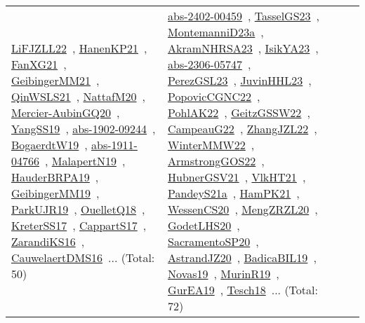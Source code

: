 {\begin{longtable}{lp{3cm}>{\raggedright\arraybackslash}p{6cm}>{\raggedright\arraybackslash}p{6cm}>{\raggedright\arraybackslash}p{8cm}}
\href{papers/LiFJZLL22.pdf}{LiFJZLL22}~\cite{LiFJZLL22}, \href{papers/HanenKP21.pdf}{HanenKP21}~\cite{HanenKP21}, \href{articles/FanXG21.pdf}{FanXG21}~\cite{FanXG21}, \href{papers/GeibingerMM21.pdf}{GeibingerMM21}~\cite{GeibingerMM21}, \href{articles/QinWSLS21.pdf}{QinWSLS21}~\cite{QinWSLS21}, \href{papers/NattafM20.pdf}{NattafM20}~\cite{NattafM20}, \href{papers/Mercier-AubinGQ20.pdf}{Mercier-AubinGQ20}~\cite{Mercier-AubinGQ20}, \href{papers/YangSS19.pdf}{YangSS19}~\cite{YangSS19}, \href{articles/abs-1902-09244.pdf}{abs-1902-09244}~\cite{abs-1902-09244}, \href{papers/BogaerdtW19.pdf}{BogaerdtW19}~\cite{BogaerdtW19}, \href{articles/abs-1911-04766.pdf}{abs-1911-04766}~\cite{abs-1911-04766}, \href{papers/MalapertN19.pdf}{MalapertN19}~\cite{MalapertN19}, \href{articles/HauderBRPA19.pdf}{HauderBRPA19}~\cite{HauderBRPA19}, \href{papers/GeibingerMM19.pdf}{GeibingerMM19}~\cite{GeibingerMM19}, \href{papers/ParkUJR19.pdf}{ParkUJR19}~\cite{ParkUJR19}, \href{papers/OuelletQ18.pdf}{OuelletQ18}~\cite{OuelletQ18}, \href{articles/KreterSS17.pdf}{KreterSS17}~\cite{KreterSS17}, \href{papers/CappartS17.pdf}{CappartS17}~\cite{CappartS17}, \href{articles/ZarandiKS16.pdf}{ZarandiKS16}~\cite{ZarandiKS16}, \href{papers/CauwelaertDMS16.pdf}{CauwelaertDMS16}~\cite{CauwelaertDMS16}... (Total: 50) & \href{articles/abs-2402-00459.pdf}{abs-2402-00459}~\cite{abs-2402-00459}, \href{papers/TasselGS23.pdf}{TasselGS23}~\cite{TasselGS23}, \href{articles/MontemanniD23a.pdf}{MontemanniD23a}~\cite{MontemanniD23a}, \href{articles/AkramNHRSA23.pdf}{AkramNHRSA23}~\cite{AkramNHRSA23}, \href{articles/IsikYA23.pdf}{IsikYA23}~\cite{IsikYA23}, \href{articles/abs-2306-05747.pdf}{abs-2306-05747}~\cite{abs-2306-05747}, \href{papers/PerezGSL23.pdf}{PerezGSL23}~\cite{PerezGSL23}, \href{papers/JuvinHHL23.pdf}{JuvinHHL23}~\cite{JuvinHHL23}, \href{papers/PopovicCGNC22.pdf}{PopovicCGNC22}~\cite{PopovicCGNC22}, \href{articles/PohlAK22.pdf}{PohlAK22}~\cite{PohlAK22}, \href{papers/GeitzGSSW22.pdf}{GeitzGSSW22}~\cite{GeitzGSSW22}, \href{articles/CampeauG22.pdf}{CampeauG22}~\cite{CampeauG22}, \href{papers/ZhangJZL22.pdf}{ZhangJZL22}~\cite{ZhangJZL22}, \href{papers/WinterMMW22.pdf}{WinterMMW22}~\cite{WinterMMW22}, \href{papers/ArmstrongGOS22.pdf}{ArmstrongGOS22}~\cite{ArmstrongGOS22}, \href{articles/HubnerGSV21.pdf}{HubnerGSV21}~\cite{HubnerGSV21}, \href{articles/VlkHT21.pdf}{VlkHT21}~\cite{VlkHT21}, \href{articles/PandeyS21a.pdf}{PandeyS21a}~\cite{PandeyS21a}, \href{articles/HamPK21.pdf}{HamPK21}~\cite{HamPK21}, \href{papers/WessenCS20.pdf}{WessenCS20}~\cite{WessenCS20}, \href{articles/MengZRZL20.pdf}{MengZRZL20}~\cite{MengZRZL20}, \href{papers/GodetLHS20.pdf}{GodetLHS20}~\cite{GodetLHS20}, \href{articles/SacramentoSP20.pdf}{SacramentoSP20}~\cite{SacramentoSP20}, \href{articles/AstrandJZ20.pdf}{AstrandJZ20}~\cite{AstrandJZ20}, \href{papers/BadicaBIL19.pdf}{BadicaBIL19}~\cite{BadicaBIL19}, \href{articles/Novas19.pdf}{Novas19}~\cite{Novas19}, \href{papers/MurinR19.pdf}{MurinR19}~\cite{MurinR19}, \href{articles/GurEA19.pdf}{GurEA19}~\cite{GurEA19}, \href{papers/Tesch18.pdf}{Tesch18}~\cite{Tesch18}... (Total: 72)\\

\end{longtable}}

